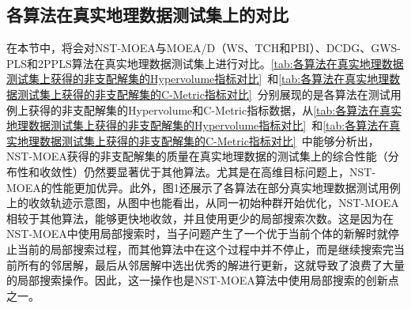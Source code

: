 \subsection{各算法在真实地理数据测试集上的对比}
\label{subsec:NST:实验与讨论:各算法在真实地理数据测试集上的对比}
在本节中，将会对NST-MOEA与MOEA/D（WS、TCH和PBI）、DCDG、GWS-PLS和2PPLS算法在真实地理数据测试集上进行对比。\autoref{tab:各算法在真实地理数据测试集上获得的非支配解集的Hypervolume指标对比}~和\autoref{tab:各算法在真实地理数据测试集上获得的非支配解集的C-Metric指标对比}~分别展现的是各算法在测试用例上获得的非支配解集的Hypervolume和C-Metric指标数据，从\autoref{tab:各算法在真实地理数据测试集上获得的非支配解集的Hypervolume指标对比}~和\autoref{tab:各算法在真实地理数据测试集上获得的非支配解集的C-Metric指标对比}~中能够分析出，NST-MOEA获得的非支配解集的质量在真实地理数据的测试集上的综合性能（分布性和收敛性）仍然要显著优于其他算法。尤其是在高维目标问题上，NST-MOEA的性能更加优异。此外，图1还展示了各算法在部分真实地理数据测试用例上的收敛轨迹示意图，从图中也能看出，从同一初始种群开始优化，NST-MOEA相较于其他算法，能够更快地收敛，并且使用更少的局部搜索次数。这是因为在NST-MOEA中使用局部搜索时，当子问题产生了一个优于当前个体的新解时就停止当前的局部搜索过程，而其他算法中在这个过程中并不停止，而是继续搜索完当前所有的邻居解，最后从邻居解中选出优秀的解进行更新，这就导致了浪费了大量的局部搜索操作。因此，这一操作也是NST-MOEA算法中使用局部搜索的创新点之一。
\par
